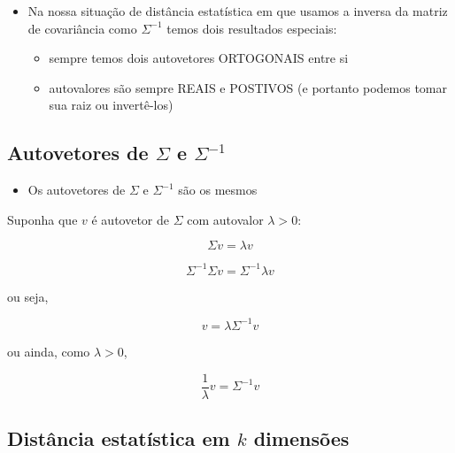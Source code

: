 \documentclass[
  letterpaper,
  DIV=11,
  numbers=noendperiod]{scrartcl}
\providecommand{\tightlist}{%
  \setlength{\itemsep}{0pt}\setlength{\parskip}{0pt}}\usepackage{longtable,booktabs,array}
\begin{document}
\begin{itemize}
\tightlist
\item
  Na nossa situação de distância estatística em que usamos a inversa da
  matriz de covariância como \(\Sigma^{-1}\) temos dois resultados
  especiais:

  \begin{itemize}
  \tightlist
  \item
    sempre temos dois autovetores ORTOGONAIS entre si
  \item
    autovalores são sempre REAIS e POSTIVOS (e portanto podemos tomar
    sua raiz ou invertê-los)
  \end{itemize}
\end{itemize}

\hypertarget{autovetores-de-sigma-e-sigma-1}{%
\subsection{\texorpdfstring{Autovetores de \(\Sigma\) e
\(\Sigma^{-1}\)}{Autovetores de \textbackslash Sigma e \textbackslash Sigma\^{}\{-1\}}}\label{autovetores-de-sigma-e-sigma-1}}

\begin{itemize}
\tightlist
\item
  Os autovetores de \(\Sigma\) e \(\Sigma^{-1}\) são os mesmos
\end{itemize}

\begin{tcolorbox}[enhanced jigsaw, title=\textcolor{quarto-callout-note-color}{\faInfo}\hspace{0.5em}{Prova}, arc=.35mm, left=2mm, leftrule=.75mm, toprule=.15mm, colbacktitle=quarto-callout-note-color!10!white, bottomrule=.15mm, rightrule=.15mm, titlerule=0mm, breakable, colframe=quarto-callout-note-color-frame, opacitybacktitle=0.6, toptitle=1mm, opacityback=0, colback=white, bottomtitle=1mm, coltitle=black]
Suponha que \(v\) é autovetor de \(\Sigma\) com autovalor
\(\lambda >0\):

\[\Sigma v = \lambda v\]

\[ \Sigma^{-1}\Sigma v = \Sigma^{-1}
\lambda v\]

ou seja,

\[ v = \lambda\Sigma^{-1} v\]

ou ainda, como \(\lambda >0\),

\[ \frac{1}{\lambda}v = \Sigma^{-1}v\]
\end{tcolorbox}

\hypertarget{distuxe2ncia-estatuxedstica-em-k-dimensuxf5es}{%
\subsection{\texorpdfstring{Distância estatística em \(k\)
dimensões}{Distância estatística em k dimensões}}\label{distuxe2ncia-estatuxedstica-em-k-dimensuxf5es}}
\end{document}

